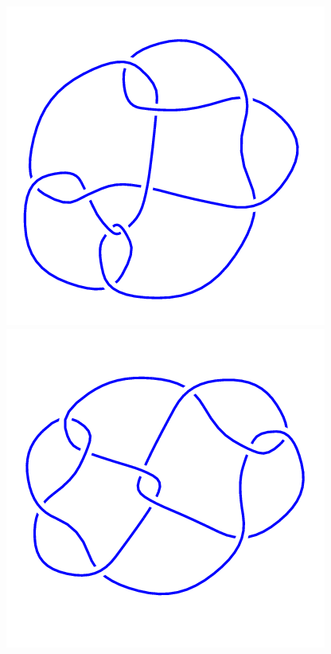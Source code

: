 \begin{figure}[H]
    \begin{minipage}[b]{.18\linewidth}
        \centering
        \includegraphics[width=\linewidth]{../data/10_57.png}
    \end{minipage}
    \begin{minipage}[b]{.18\linewidth}
        \centering
        \includegraphics[width=\linewidth]{../data/10_58.png}

\end{minipage}
\end{figure}
